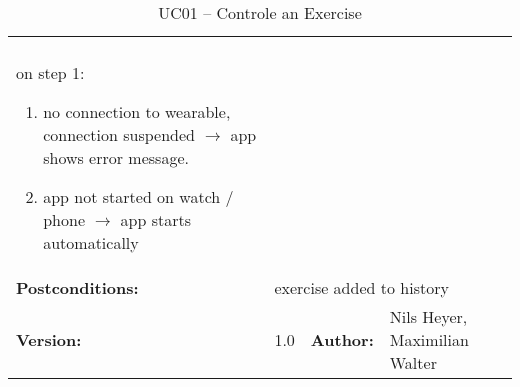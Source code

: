 \begin{table}[H]
\begin{tabular}{|l|l|l|l|l|l|}
{{			$ $\\on step 1:
			\begin{enumerate}[itemsep=-5]
				\item no connection to wearable, connection suspended $\rightarrow$ app shows error message.
				\item app not started on watch / phone $\rightarrow$ app starts automatically
			\end{enumerate}
		}} \\ \hline
		\textbf{Postconditions:} & \multicolumn{5}{l|}{exercise added to history} \\ \hline
		\textbf{Version:} & \multicolumn{2}{l|}{1.0} & \textbf{Author:} & \multicolumn{2}{l|}{Nils Heyer, Maximilian Walter} \\ \hline
	\end{tabular}
	\caption{UC01 -- Controle an Exercise}
	\label{cae}
\end{table}

